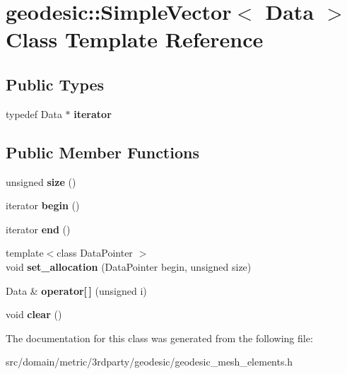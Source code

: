 \hypertarget{classgeodesic_1_1_simple_vector}{}\section{geodesic\+:\+:Simple\+Vector$<$ Data $>$ Class Template Reference}
\label{classgeodesic_1_1_simple_vector}
\subsection*{Public Types}
\begin{DoxyCompactItemize}
\item 
\hypertarget{classgeodesic_1_1_simple_vector_a459f45bc10dd68758f1b2861418b2809}{}typedef Data $\ast$ {\bfseries iterator}\label{classgeodesic_1_1_simple_vector_a459f45bc10dd68758f1b2861418b2809}

\end{DoxyCompactItemize}
\subsection*{Public Member Functions}
\begin{DoxyCompactItemize}
\item 
\hypertarget{classgeodesic_1_1_simple_vector_abe37e88004236e478717fa7dfb92b926}{}unsigned {\bfseries size} ()\label{classgeodesic_1_1_simple_vector_abe37e88004236e478717fa7dfb92b926}

\item 
\hypertarget{classgeodesic_1_1_simple_vector_a90940bb69ba27b6568e10673c4e8b6e6}{}iterator {\bfseries begin} ()\label{classgeodesic_1_1_simple_vector_a90940bb69ba27b6568e10673c4e8b6e6}

\item 
\hypertarget{classgeodesic_1_1_simple_vector_afa17adf1d048e5071b98ec7f6dbb5c5c}{}iterator {\bfseries end} ()\label{classgeodesic_1_1_simple_vector_afa17adf1d048e5071b98ec7f6dbb5c5c}

\item 
\hypertarget{classgeodesic_1_1_simple_vector_ad4a9fc5051331fb3967c2d0c43c7cd39}{}{\footnotesize template$<$class Data\+Pointer $>$ }\\void {\bfseries set\+\_\+allocation} (Data\+Pointer begin, unsigned size)\label{classgeodesic_1_1_simple_vector_ad4a9fc5051331fb3967c2d0c43c7cd39}

\item 
\hypertarget{classgeodesic_1_1_simple_vector_a9950a7024a24708dc78ed048fdc58da5}{}Data \& {\bfseries operator\mbox{[}$\,$\mbox{]}} (unsigned i)\label{classgeodesic_1_1_simple_vector_a9950a7024a24708dc78ed048fdc58da5}

\item 
\hypertarget{classgeodesic_1_1_simple_vector_a4cb244c3f895214db162317cd1c5cca1}{}void {\bfseries clear} ()\label{classgeodesic_1_1_simple_vector_a4cb244c3f895214db162317cd1c5cca1}

\end{DoxyCompactItemize}


The documentation for this class was generated from the following file\+:\begin{DoxyCompactItemize}
\item 
src/domain/metric/3rdparty/geodesic/geodesic\+\_\+mesh\+\_\+elements.\+h\end{DoxyCompactItemize}
